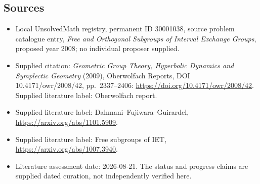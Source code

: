 \documentclass[11pt]{article}
\begin{document}
\subsection{Sources}
\begin{itemize}\item Local UnsolvedMath registry, permanent ID 30001038, source problem catalogue entry, \emph{Free and Orthogonal Subgroups of Interval Exchange Groups}, proposed year 2008; no individual proposer supplied.\item Supplied citation: \emph{Geometric Group Theory, Hyperbolic Dynamics and Symplectic Geometry} (2009), Oberwolfach Reports, DOI 10.4171/owr/2008/42, pp.\ 2337--2406: \url{https://doi.org/10.4171/owr/2008/42}. Supplied literature label: Oberwolfach report.\item Supplied literature label: Dahmani--Fujiwara--Guirardel, \url{https://arxiv.org/abs/1101.5909}.\item Supplied literature label: Free subgroups of IET, \url{https://arxiv.org/abs/1007.3940}.\item Literature assessment date: 2026-08-21. The status and progress claims are supplied dated curation, not independently verified here.\end{itemize}
\end{document}
